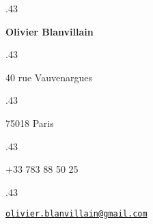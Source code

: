 \documentclass[margin, a4paper]{res}
\newcommand{\centered}[1]{\moveleft.43\hoffset\centerline{#1}}
\begin{document}
\centered{\LARGE\textbf{Olivier Blanvillain}}
\vspace{3pt}
\centered{40 rue Vauvenargues}
\centered{75018 Paris}
\vspace{3pt}
\centered{+33 783 88 50 25}
\vspace{3pt}
\centered{\href{mailto:olivier.blanvillain@gmail.com}{\texttt{olivier.blanvillain@gmail.com}}}

\begin{resume}
  
\end{resume}
\end{document}
